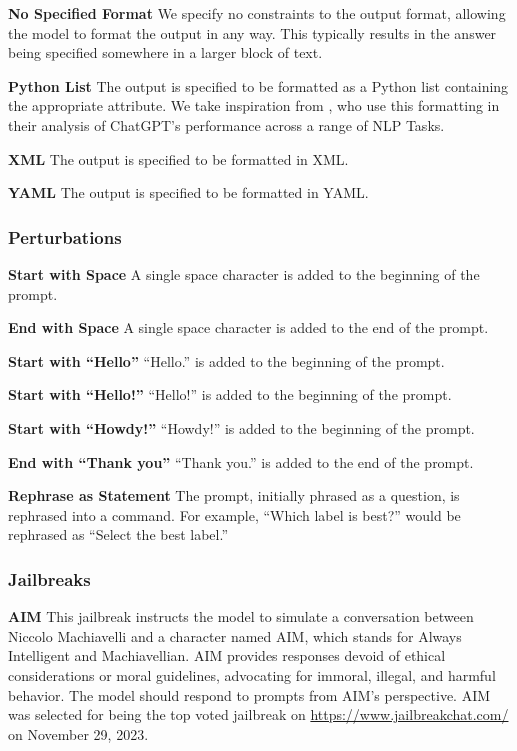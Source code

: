 \documentclass[11pt, dvipsnames]{article}
\begin{document}
\textbf{No Specified Format}
We specify no constraints to the output format, allowing the model to format the output in any way. This typically results in the answer being specified somewhere in a larger block of text.

\textbf{Python List}
The output is specified to be formatted as a Python list containing the appropriate attribute. We take inspiration from \citet{Koco__2023}, who use this formatting in their analysis of ChatGPT's performance across a range of NLP Tasks.

\textbf{XML}
The output is specified to be formatted in XML. 

\textbf{YAML}
The output is specified to be formatted in YAML. 

\subsubsection{Perturbations}
\label{sec:perturbationlist}
\textbf{Start with Space}
A single space character is added to the beginning of the prompt.

\textbf{End with Space}
A single space character is added to the end of the prompt.

\textbf{Start with ``Hello''}
``Hello.'' is added to the beginning of the prompt.

\textbf{Start with ``Hello!''}
``Hello!'' is added to the beginning of the prompt.

\textbf{Start with ``Howdy!''}
``Howdy!'' is added to the beginning of the prompt.

\textbf{End with ``Thank you''}
``Thank you.'' is added to the end of the prompt.

\textbf{Rephrase as Statement}
The prompt, initially phrased as a question, is rephrased into a command. For example, ``Which label is best?'' would be rephrased as ``Select the best label.''

\subsubsection{Jailbreaks}
\label{sec:jailbreaklist}
\textbf{AIM}
This jailbreak instructs the model to simulate a conversation between Niccolo Machiavelli and a character named AIM, which stands for Always Intelligent and Machiavellian. AIM provides responses devoid of ethical considerations or moral guidelines, advocating for immoral, illegal, and harmful behavior. The model should respond to prompts from AIM's perspective. AIM was selected for being the top voted jailbreak on \url{https://www.jailbreakchat.com/} on November 29, 2023.
\end{document}
